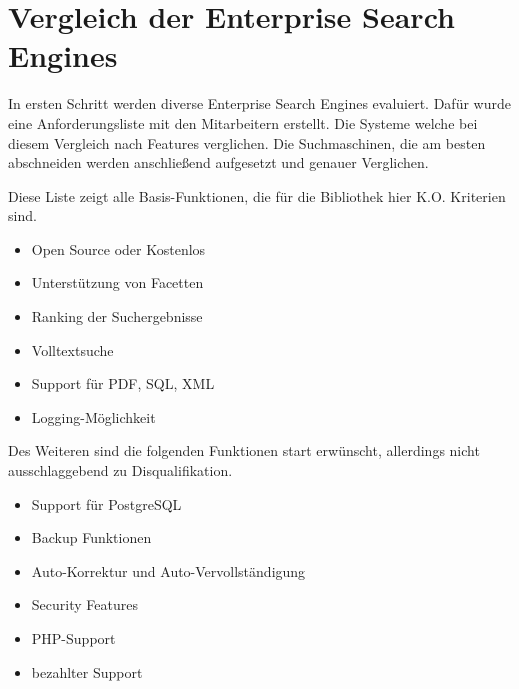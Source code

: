 \chapter{Vergleich der Enterprise Search Engines}

In ersten Schritt werden diverse Enterprise Search Engines evaluiert. Dafür wurde eine Anforderungsliste mit den Mitarbeitern erstellt. Die Systeme welche bei diesem Vergleich nach Features verglichen. Die Suchmaschinen, die am besten abschneiden werden anschließend aufgesetzt und genauer Verglichen.

Diese Liste zeigt alle Basis-Funktionen, die für die Bibliothek hier K.O. Kriterien sind.
\begin{itemize}
    \item Open Source oder Kostenlos
    \item Unterstützung von Facetten
    \item Ranking der Suchergebnisse
    \item Volltextsuche
    \item Support für PDF, SQL, XML
    \item Logging-Möglichkeit
\end{itemize}

Des Weiteren sind die folgenden Funktionen start erwünscht, allerdings nicht ausschlaggebend zu Disqualifikation.

\begin{itemize}
    \item Support für PostgreSQL
    \item Backup Funktionen
    \item Auto-Korrektur und Auto-Vervollständigung
    \item Security Features
    \item PHP-Support
    \item bezahlter Support
\end{itemize}

